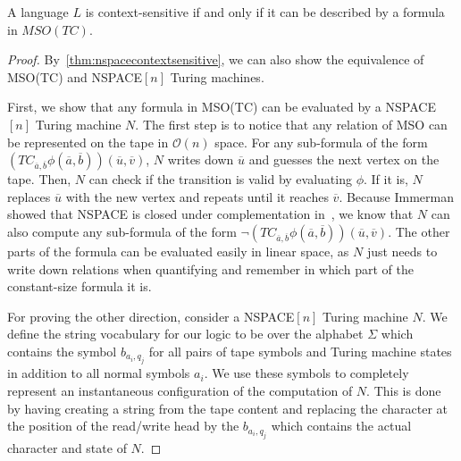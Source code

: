 \begin{theorem}
    \label{thm:contextsensitveMSOTC}
    A language $L$ is context-sensitive if and only if it can be described by a formula in $MSO(TC)$.
\end{theorem}

\begin{proof}
    By~\cref{thm:nspacecontextsensitive}, we can also show the equivalence of MSO(TC) and NSPACE$[n]$ Turing machines.

    First, we show that any formula in MSO(TC) can be evaluated by a NSPACE$[n]$ Turing machine $N$.
    The first step is to notice that any relation of MSO can be represented on the tape in $\mathcal{O}(n)$ space.
    For any sub-formula of the form $\left(TC_{\overline{a}, \overline{b}}\phi\left(\overline{a}, \overline{b}\right)\right)\left(\overline{u}, \overline{v}\right)$, $N$ writes down $\overline{u}$ and guesses the next vertex on the tape.
    Then, $N$ can check if the transition is valid by evaluating $\phi$.
    If it is, $N$ replaces $\overline{u}$ with the new vertex and repeats until it reaches $\overline{v}$.
    Because Immerman showed that NSPACE is closed under complementation in~\cite{Immerman1988}, we know that $N$ can also compute any sub-formula of the form $\neg\left(TC_{\overline{a}, \overline{b}}\phi\left(\overline{a}, \overline{b}\right)\right)\left(\overline{u}, \overline{v}\right)$.
    The other parts of the formula can be evaluated easily in linear space, as $N$ just needs to write down relations when quantifying and remember in which part of the constant-size formula it is.

    \vspace{5mm}

    For proving the other direction, consider a NSPACE$[n]$ Turing machine $N$.
    We define the string vocabulary for our logic to be over the alphabet $\Sigma$ which contains the symbol $b_{a_i, q_j}$ for all pairs of tape symbols and Turing machine states in addition to all normal symbols $a_i$.
    We use these symbols to completely represent an instantaneous configuration of the computation of $N$.
    This is done by having creating a string from the tape content and replacing the character at the position of the read/write head by the $b_{a_i, q_j}$ which contains the actual character and state of $N$.


\end{proof}

